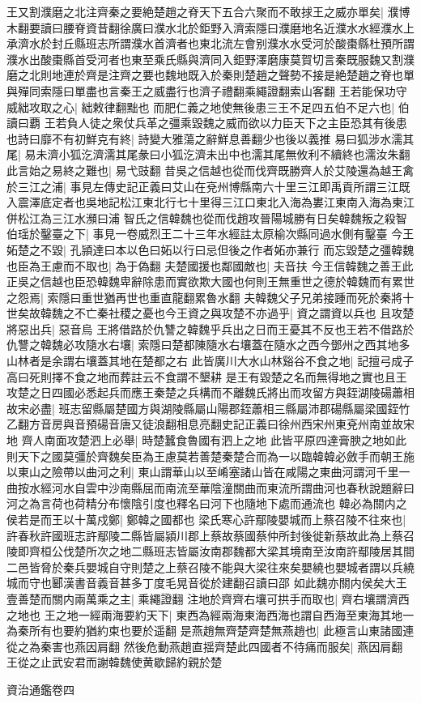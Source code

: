 王又割濮磨之北注齊秦之要絶楚趙之脊天下五合六聚而不敢捄王之威亦單矣|{
	濮博木翻要讀曰腰脊資昔翻徐廣曰濮水北於鉅野入濟索隱曰濮磨地名近濮水水經濮水上承濟水於封丘縣班志所謂濮水首濟者也東北流左會别濮水水受河於酸棗縣杜預所謂濮水出酸棗縣首受河者也東至乘氏縣與濟同入鉅野澤磨康莫賀切言秦既服魏又割濮磨之北則地連於齊是注齊之要也魏地既入於秦則楚趙之聲勢不接是絶楚趙之脊也單與殫同索隱曰單盡也言秦王之威盡行也濟子禮翻乘繩證翻索山客翻}
王若能保功守威絀攻取之心|{
	絀敕律翻黜也}
而肥仁義之地使無後患三王不足四五伯不足六也|{
	伯讀曰覇}
王若負人徒之衆仗兵革之彊乘毀魏之威而欲以力臣天下之主臣恐其有後患也詩曰靡不有初鮮克有終|{
	詩變大雅蕩之辭鮮息善翻少也後以義推}
易曰狐涉水濡其尾|{
	易未濟小狐汔濟濡其尾彖曰小狐汔濟未出中也濡其尾無攸利不續終也濡汝朱翻}
此言始之易終之難也|{
	易弋豉翻}
昔吳之信越也從而伐齊既勝齊人於艾陵還為越王禽於三江之浦|{
	事見左傳史記正義曰艾山在兗州博縣南六十里三江即禹貢所謂三江既入震澤底定者也吳地記松江東北行七十里得三江口東北入海為婁江東南入海為東江併松江為三江水瀕曰浦}
智氏之信韓魏也從而伐趙攻晉陽城勝有日矣韓魏叛之殺智伯瑶於鑿臺之下|{
	事見一卷威烈王二十三年水經註太原榆次縣同過水側有鑿臺}
今王妬楚之不毀|{
	孔頴達曰本以色曰妬以行曰忌但後之作者妬亦兼行}
而忘毀楚之彊韓魏也臣為王慮而不取也|{
	為于偽翻}
夫楚國援也鄰國敵也|{
	夫音扶}
今王信韓魏之善王此正吳之信越也臣恐韓魏卑辭除患而實欲欺大國也何則王無重世之德於韓魏而有累世之怨焉|{
	索隱曰重世猶再世也重直龍翻累魯水翻}
夫韓魏父子兄弟接踵而死於秦將十世矣故韓魏之不亡秦社稷之憂也今王資之與攻楚不亦過乎|{
	資之謂資以兵也}
且攻楚將惡出兵|{
	惡音烏}
王將借路於仇讐之韓魏乎兵出之日而王憂其不反也王若不借路於仇讐之韓魏必攻隨水右壤|{
	索隱曰楚都陳隨水右壤蓋在隨水之西今鄧州之西其地多山林者是余謂右壤蓋其地在楚都之右}
此皆廣川大水山林谿谷不食之地|{
	記擅弓成子高曰死則擇不食之地而葬註云不食謂不墾耕}
是王有毀楚之名而無得地之實也且王攻楚之日四國必悉起兵而應王秦楚之兵構而不離魏氏將出而攻留方與銍湖陵碭蕭相故宋必盡|{
	班志留縣屬楚國方與湖陵縣屬山陽郡銍蕭相三縣屬沛郡碭縣屬梁國銍竹乙翻方音房與音預碭音唐又徒浪翻相息亮翻史記正義曰徐州西宋州東兗州南並故宋地}
齊人南面攻楚泗上必舉|{
	時楚蠶食魯國有泗上之地}
此皆平原四達膏腴之地如此則天下之國莫彊於齊魏矣臣為王慮莫若善楚秦楚合而為一以臨韓韓必斂手而朝王施以東山之險帶以曲河之利|{
	東山謂華山以至崤塞諸山皆在咸陽之東曲河謂河千里一曲按水經河水自雲中沙南縣屈而南流至華陰潼關曲而東流所謂曲河也春秋說題辭曰河之為言荷也荷精分布懷陰引度也釋名曰河下也隨地下處而通流也}
韓必為關内之侯若是而王以十萬戍鄭|{
	鄭韓之國都也}
梁氏寒心許鄢陵嬰城而上蔡召陵不往來也|{
	許春秋許國班志許鄢陵二縣皆屬潁川郡上蔡故蔡國蔡仲所封後徙新蔡故此為上蔡召陵即齊桓公伐楚所次之地二縣班志皆屬汝南郡魏都大梁其境南至汝南許鄢陵居其間二邑皆脅於秦兵嬰城自守則楚之上蔡召陵不能與大梁往來矣嬰繞也嬰城者謂以兵繞城而守也郾漢書音義音甚多丁度毛晃音從於建翻召讀曰邵}
如此魏亦關内侯矣大王壹善楚而關内兩萬乘之主|{
	乘繩證翻}
注地於齊齊右壤可拱手而取也|{
	齊右壤謂濟西之地也}
王之地一經兩海要約天下|{
	東西為經兩海東海西海也謂自西海至東海其地一為秦所有也要約猶約束也要於遥翻}
是燕趙無齊楚齊楚無燕趙也|{
	此極言山東諸國連從之為秦害也燕因肩翻}
然後危動燕趙直揺齊楚此四國者不待痛而服矣|{
	燕因肩翻}
王從之止武安君而謝韓魏使黄歇歸約親於楚

資治通鑑卷四
